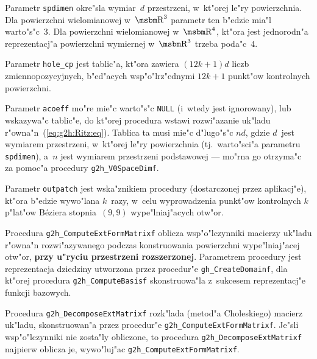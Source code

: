 Parametr \texttt{spdimen} okre"sla wymiar~$d$ przestrzeni, w~kt"orej le"ry
powierzchnia. Dla powierzchni wielomianowej w~$\R^3$ parametr ten b"edzie
mia"l warto"s"c~$3$. Dla powierzchni wielomianowej w~$\R^4$, kt"ora jest
jednorodn"a reprezentacj"a powierzchni wymiernej w~$\R^3$ trzeba poda"c~$4$.

Parametr \texttt{hole\_cp} jest tablic"a, kt"ora zawiera $(12k+1)d$ liczb
zmiennopozycyjnych, b"ed"acych wsp"o"lrz"ednymi $12k+1$ punkt"ow kontrolnych
powierzchni.

Parametr \texttt{acoeff} mo"re mie"c warto"s"c \texttt{NULL}
(i~wtedy jest ignorowany), lub wskazywa"c tablic"e, do kt"orej procedura
wstawi rozwi"azanie uk"ladu r"owna"n~(\ref{eq:g2h:Ritz:eq}). Tab\-li\-ca ta musi
mie"c d"lugo"s"c $nd$, gdzie $d$~jest wymiarem przestrzeni, w~kt"orej le"ry
powierzchnia (tj.\ warto"sci"a parametru \texttt{spdimen}), a~$n$ jest
wymiarem przestrzeni podstawowej --- mo"rna go otrzyma"c za pomoc"a procedury
\texttt{g2h\_V0SpaceDimf}.

Parametr \texttt{outpatch} jest wska"znikiem procedury (dostarczonej przez
aplikacj"e), kt"ora b"edzie wywo"lana $k$~razy, w~celu wyprowadzenia
punkt"ow kontrolnych $k$ p"lat"ow B\'{e}ziera stopnia~$(9,9)$ wype"lniaj"acych
otw"or.


\vspace{\bigskipamount}
\begin{sloppypar}
Procedura \texttt{g2h\_ComputeExtFormMatrixf} oblicza wsp"o"lczynniki macierzy
uk"la\-du r"owna"n rozwi"azywanego podczas konstruowania powierzchni
wype"lniaj"acej otw"or, \textbf{przy u"ryciu przestrzeni rozszerzonej}.
Parametrem procedury jest reprezentacja dziedziny utworzona przez procedur"e
\texttt{gh\_CreateDomainf}, dla kt"orej procedura \texttt{g2h\_ComputeBasisf}
skonstruowa"la z~sukcesem reprezentacj"e funkcji bazowych.%
\end{sloppypar}

\vspace{\medskipamount}
\begin{sloppypar}
Procedura \texttt{g2h\_DecomposeExtMatrixf} rozk"lada (metod"a Choleskiego)
macierz uk"la\-du, skonstruowan"a przez procedur"e
\texttt{g2h\_ComputeExtFormMatrixf}. Je"sli wsp"o"lczynniki nie zosta"ly obliczone,
to procedura \texttt{g2h\_DecomposeExtMatrixf} najpierw oblicza je, wywo"luj"ac
\texttt{g2h\_ComputeExtFormMatrixf}.%
\end{sloppypar}

